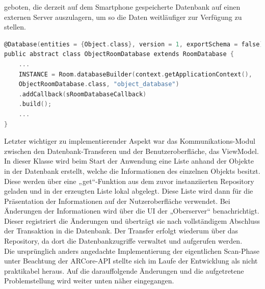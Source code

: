 geboten, die derzeit auf dem Smartphone gespeicherte Datenbank auf einen externen Server auszulagern, um so die Daten weitläufiger zur Verfügung zu stellen. 
\\ 
\begin{lstlisting}[language=C,
    frame=lines,           % Ein Rahmen um den Code (single for box, lines for top and bottom)
    xleftmargin=\parindent,  % Rahmen link von den Zahlen
    style=algoBericht,
    label={code:dblayer},
    captionpos=b,           % Caption unter den Code setzen
caption={Erzeugung des Datenbank-Layers „Room“}]
@Database(entities = {Object.class}, version = 1, exportSchema = false)
public abstract class ObjectRoomDatabase extends RoomDatabase {
    ...
    INSTANCE = Room.databaseBuilder(context.getApplicationContext(),
    ObjectRoomDatabase.class, "object_database")
    .addCallback(sRoomDatabaseCallback)
    .build();
    ...
}
\end{lstlisting}
Letzter wichtiger zu implementierender Aspekt war das Kommunikations-Modul zwischen den Datenbank-Transferen und der Benutzeroberfläche, das ViewModel. 
In dieser Klasse wird beim Start der Anwendung eine Liste anhand der Objekte in der Datenbank erstellt, welche die Informationen des einzelnen Objekts besitzt. 
Diese werden über eine „get“-Funktion aus dem zuvor instanziierten Repository geladen und in der erzeugten Liste lokal abgelegt. Diese Liste wird dann für 
die Präsentation der Informationen auf der Nutzeroberfläche verwendet. Bei Änderungen der Informationen wird über die \acs{UI} der „Oberserver“ benachrichtigt. 
Dieser registriert die Änderungen und überträgt sie nach vollständigem Abschluss der Transaktion in die Datenbank. Der Transfer erfolgt wiederum über das 
Repository, da dort die Datenbankzugriffe verwaltet und aufgerufen werden. %
\\ 
\linebreak
Die ursprünglich anders angedachte Implementierung der eigentlichen Scan-Phase unter Beachtung der ARCore-\acs{API} stellte sich im Laufe der Entwicklung 
als nicht praktikabel heraus. Auf die darauffolgende Änderungen und die aufgetretene Problemstellung wird weiter unten näher eingegangen. 
